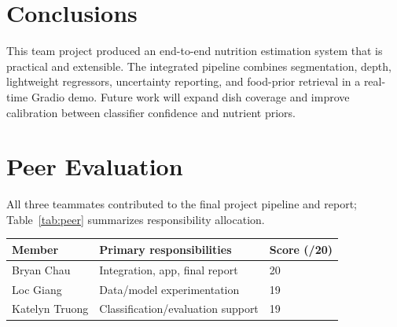 \documentclass[10pt,twocolumn,letterpaper]{article}
\begin{document}
\section{Conclusions}
This team project produced an end-to-end nutrition estimation system that is practical and extensible. The integrated pipeline combines segmentation, depth, lightweight regressors, uncertainty reporting, and food-prior retrieval in a real-time Gradio demo. Future work will expand dish coverage and improve calibration between classifier confidence and nutrient priors.

\section{Peer Evaluation}
All three teammates contributed to the final project pipeline and report; Table~\ref{tab:peer} summarizes responsibility allocation.

\begin{center}
\begin{minipage}{0.98\columnwidth}
\centering
{}
\label{tab:peer}
\small
\setlength{\tabcolsep}{4pt}
\begin{tabular}{lll}
\toprule
Member & Primary responsibilities & Score (/20) \\
\midrule
Bryan Chau & Integration, app, final report & 20 \\
Loc Giang & Data/model experimentation & 19 \\
Katelyn Truong & Classification/evaluation support & 19 \\
\bottomrule
\end{tabular}
\end{minipage}
\end{center}
\end{document}
